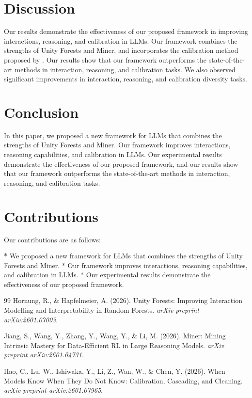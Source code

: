 \documentclass{article}
\begin{document}
\section{Discussion}
Our results demonstrate the effectiveness of our proposed framework in improving interactions, reasoning, and calibration in LLMs. Our framework combines the strengths of Unity Forests and Miner, and incorporates the calibration method proposed by \citet{hao2026modelsknowknowcalibration}. Our results show that our framework outperforms the state-of-the-art methods in interaction, reasoning, and calibration tasks. We also observed significant improvements in interaction, reasoning, and calibration diversity tasks.

\section{Conclusion}
In this paper, we proposed a new framework for LLMs that combines the strengths of Unity Forests and Miner. Our framework improves interactions, reasoning capabilities, and calibration in LLMs. Our experimental results demonstrate the effectiveness of our proposed framework, and our results show that our framework outperforms the state-of-the-art methods in interaction, reasoning, and calibration tasks.

\section{Contributions}
Our contributions are as follows:

* We proposed a new framework for LLMs that combines the strengths of Unity Forests and Miner.
* Our framework improves interactions, reasoning capabilities, and calibration in LLMs.
* Our experimental results demonstrate the effectiveness of our proposed framework.

\begin{thebibliography}{99}
Hornung, R., \& Hapfelmeier, A. (2026). Unity Forests: Improving Interaction Modelling and Interpretability in Random Forests. \emph{arXiv preprint arXiv:2601.07003}.

Jiang, S., Wang, Y., Zhang, Y., Wang, Y., \& Li, M. (2026). Miner: Mining Intrinsic Mastery for Data-Efficient RL in Large Reasoning Models. \emph{arXiv preprint arXiv:2601.04731}.

Hao, C., Lu, W., Ishiwaka, Y., Li, Z., Wan, W., \& Chen, Y. (2026). When Models Know When They Do Not Know: Calibration, Cascading, and Cleaning. \emph{arXiv preprint arXiv:2601.07965}.
\end{thebibliography}
\end{document}
